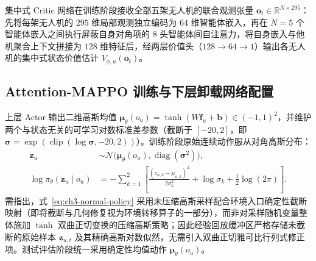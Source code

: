 集中式 Critic 网络在训练阶段接收全部五架无人机的联合观测张量 $\mathbf{o}_t\in\mathbb{R}^{N\times 295}$：先将每架无人机的 $295$ 维局部观测独立编码为 $64$ 维智能体嵌入，再在 $N=5$ 个智能体嵌入之间执行屏蔽自身对角项的 $8$ 头智能体间自注意力，将自身嵌入与他机聚合上下文拼接为 $128$ 维特征后，经两层价值头（$128\to 64\to 1$）输出各无人机的集中式状态价值估计 $V_{\phi,u}(\mathbf{o}_t)$。

\subsection{Attention-MAPPO 训练与下层卸载网络配置}
\label{sec:ppo-training}

上层 Actor 输出二维高斯均值 $\boldsymbol{\mu}_\theta(o_u)=\tanh(W\mathbf{f}_u+\mathbf{b})\in(-1,1)^2$，并维护两个与状态无关的可学习对数标准差参数（截断于 $[-20,2]$，即 $\boldsymbol{\sigma}=\exp(\operatorname{clip}(\log\boldsymbol{\sigma},-20,2))$）。训练阶段原始连续动作服从对角高斯分布：
\begin{equation}
 \begin{aligned}
 \mathbf z_u&\sim\mathcal N\big(\boldsymbol\mu_\theta(o_u),
                   \operatorname{diag}(\boldsymbol\sigma^2)\big),\\
 \log\pi_\theta(\mathbf z_u\mid o_u)
 &=-\sum_{k=1}^{2}\left[
 \frac{(z_{u,k}-\mu_{u,k})^2}{2\sigma_k^2}
 +\log\sigma_k+\tfrac12\log(2\pi)\right].
 \end{aligned}
 \label{eq:ch3-normal-policy}
\end{equation}
需指出，式~\eqref{eq:ch3-normal-policy} 采用未压缩高斯采样配合环境入口确定性截断映射（即将截断与几何修复视为环境转移算子的一部分），而非对采样随机变量整体施加 $\tanh$ 双曲正切变换的压缩高斯策略；因此经验回放缓冲区严格存储未截断的原始样本 $\mathbf{z}_{u,t}$ 及其精确高斯对数似然，无需引入双曲正切雅可比行列式修正项。测试评估阶段统一采用确定性均值动作 $\boldsymbol{\mu}_\theta(o_u)$。

